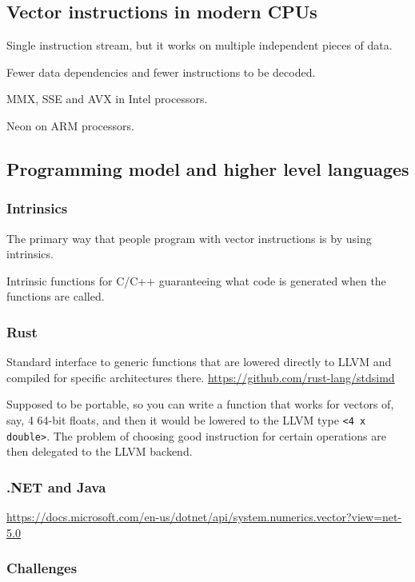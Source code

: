 \documentclass{article}
\begin{document}
\subsection{Vector instructions in modern CPUs}

Single instruction stream, but it works on multiple independent pieces of data.

Fewer data dependencies and fewer instructions to be decoded.

MMX, SSE and AVX in Intel processors.

Neon on ARM processors.

\subsection{Programming model and higher level languages}

\subsubsection{Intrinsics}

The primary way that people program with vector instructions is by using intrinsics.

Intrinsic functions for C/C++ guaranteeing what code is generated when the functions are called.

\subsubsection{Rust}

Standard interface to generic functions that are lowered directly to LLVM and compiled for specific architectures there.
\url{https://github.com/rust-lang/stdsimd}

Supposed to be portable, so you can write a function that works for vectors of, say, 4 64-bit floats, and then it would be lowered to the LLVM type \verb!<4 x double>!. The problem of choosing good instruction for certain operations are then delegated to the LLVM backend.

\subsubsection{.NET and Java}

\url{https://docs.microsoft.com/en-us/dotnet/api/system.numerics.vector?view=net-5.0}


\subsubsection{Challenges}
\end{document}
